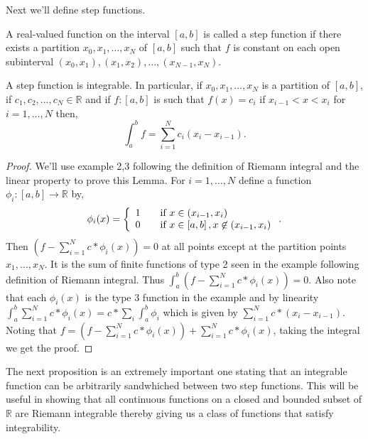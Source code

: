 Next we'll define step functions.
\begin{Definition}
    A real-valued function on the interval $\left[a,b\right]$ is called a step function if there
    exists a partition $x_0,x_1,\dots,x_N$ of $\left[a,b\right]$ such that $f$ is constant on each
    open subinterval $(x_0,x_1),(x_1,x_2),\dots,(x_{N-1},x_N)$.
\end{Definition}
\begin{Lemma}
    A step function is integrable. In particular, if $x_0,x_1,\dots,x_N$ is a partition 
    of $\left[a,b\right]$, if $c_1,c_2,\dots,c_N \in \mathbb{R}$ and if $f : \left[a,b\right]$ is
    such that $f(x) = c_i$ if $x_{i-1} < x < x_i$ for $i = 1,\dots,N$ then,
    \[ \int_a^b f = \sum_{i = 1}^N c_i(x_i - x_{i-1}). \]
\end{Lemma}
\begin{proof}
    
    We'll use example 2,3 following the definition of Riemann integral and the linear property to
    prove this Lemma. For $i = 1, \dots, N$ define a function $\phi_{i} : \left[a,b\right] \to
    \mathbb{R}$ by,
    \[ \phi_{i}(x) = \left\{ 
	    \begin{array}{l l}
		1 & \quad \text{if } x \in (x_{i-1},x_i) \\
		0 & \quad \text{if } x \in \left[a,b\right], x \not \in (x_{i-1},x_i) 
	    \end{array} \right. .\]
    Then $(f - \sum_{i=1}^N c*\phi_{i}(x)) = 0$ at all points except at the partition points
    $x_1,\dots,x_N$. It is the sum of finite functions of type 2 seen in the example following
    definition of Riemann integral. Thus $\int_a^b ( f - \sum_{i=1}^N c*\phi_{i}(x) ) = 0$. Also
    note that each $\phi_{i}(x)$ is the type 3 function in the example and by linearity $\int_a^b 
    \sum_{i=1}^N c*\phi_{i}(x) = c*\sum_{i}\int_a^b\phi_{i}$ which is given by $\sum_{i=1}^N c*(x_i
    - x_{i-1})$. Noting that $f = (f - \sum_{i=1}^N c*\phi_{i}(x) ) + \sum_{i=1}^N c*\phi_{i}(x)$,
    taking the integral we get the proof.
\end{proof}
The next proposition is an extremely important one stating that an integrable function can be
arbitrarily sandwhiched between two step functions. This will be useful in showing that all
continuous functions on a closed and bounded subset of $\mathbb{R}$ are Riemann integrable thereby
giving us a class of functions that satisfy integrability.

